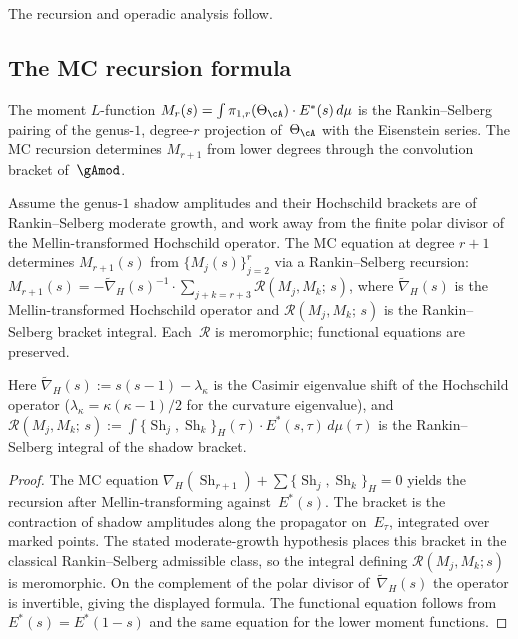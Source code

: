 The recursion and operadic analysis follow.

\subsection{The MC recursion formula}%
\label{sec:operadic-rankin-selberg}%

The moment $L$-function $M_r(s) = \int \pi_{1,r}(\Theta_\cA)
\cdot E^*(s)\,d\mu$ is the Rankin--Selberg pairing of the
genus-$1$, degree-$r$ projection of~$\Theta_\cA$ with the
Eisenstein series. The MC recursion determines $M_{r+1}$ from
lower degrees through the convolution bracket of~$\gAmod$.

\begin{theorem}%
\label{thm:mc-recursion-moment}%
\ClaimStatusProvedHere%
Assume the genus-$1$ shadow amplitudes and their Hochschild brackets are
of Rankin--Selberg moderate growth, and work away from the finite polar
divisor of the Mellin-transformed Hochschild operator. The MC equation at
degree $r{+}1$ determines $M_{r+1}(s)$
from $\{M_j(s)\}_{j=2}^r$ via a Rankin--Selberg recursion:
$M_{r+1}(s) = -\widetilde{\nabla}_H(s)^{-1} \cdot
\sum_{j+k=r+3} \mathcal{R}(M_j, M_k;\,s)$,
where $\widetilde{\nabla}_H(s)$ is the Mellin-transformed
Hochschild operator and $\mathcal{R}(M_j, M_k;\,s)$ is the
Rankin--Selberg bracket integral.
Each~$\mathcal{R}$ is meromorphic; functional equations are preserved.

Here $\widetilde{\nabla}_H(s) := s(s{-}1) - \lambda_\kappa$
is the Casimir eigenvalue shift of the Hochschild operator
\textup{(}$\lambda_\kappa = \kappa(\kappa{-}1)/2$ for the
curvature eigenvalue\textup{)}, and
$\mathcal{R}(M_j, M_k;\,s) := \int
\{\operatorname{Sh}_j, \operatorname{Sh}_k\}_H(\tau)
\cdot E^*(s,\tau)\,d\mu(\tau)$
is the Rankin--Selberg integral of the shadow bracket.
\end{theorem}

\begin{proof}
The MC equation $\nabla_H(\operatorname{Sh}_{r+1}) +
\sum\{\operatorname{Sh}_j, \operatorname{Sh}_k\}_H = 0$
yields the recursion after Mellin-transforming against~$E^*(s)$.
The bracket is the contraction of shadow amplitudes along the
propagator on~$E_\tau$, integrated over marked points. The stated
moderate-growth hypothesis places this bracket in the classical
Rankin--Selberg admissible class, so the integral defining
$\mathcal{R}(M_j,M_k;s)$ is meromorphic. On the complement of the polar
divisor of~$\widetilde\nabla_H(s)$ the operator is invertible, giving the
displayed formula. The functional equation follows from
$E^*(s)=E^*(1{-}s)$ and the same equation for the lower moment functions.
\end{proof}

